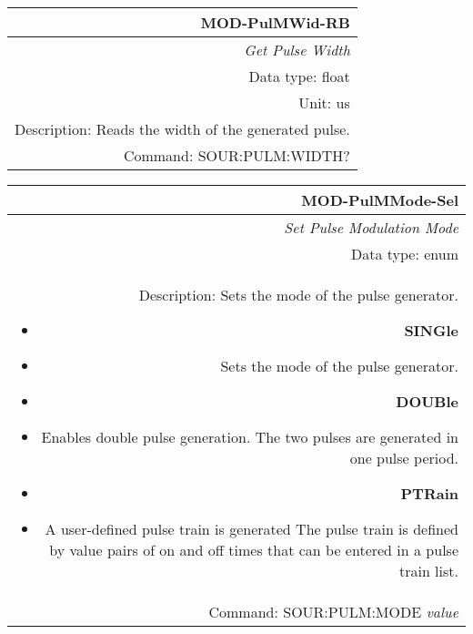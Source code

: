 \documentclass[openany]{article}
\begin{document}
		\begin{tabular}{N}
			\hline
			\bfseries MOD-PulMWid-RB \\ \hline
			\emph{Get Pulse Width} \\
			Data type: float \\
			Unit: us \\
			Description: Reads the width of the generated pulse. \\
			Command: SOUR:PULM:WIDTH? \\

		\end{tabular}
%
		\begin{tabular}{N}
			\hline
			\bfseries MOD-PulMMode-Sel \\ \hline
			\emph{Set Pulse Modulation Mode} \\
			Data type: enum \\  
			Description: Sets the mode of the pulse generator.\begin{itemize}[noitemsep]
				\small
				\item[] \textbf{SINGle}
                                \item[] Sets the mode of the pulse generator.
                                \item[] \textbf{DOUBle}
                                \item[] Enables double pulse generation. The two pulses are generated in one pulse period.
				\item[] \textbf{PTRain}
                                \item[] A user-defined pulse train is generated The pulse train is defined by value pairs of on and off times that can be entered in a pulse train list.

			\end{itemize} \\
			Command: SOUR:PULM:MODE \emph{value} \\

		\end{tabular}
\end{document}
